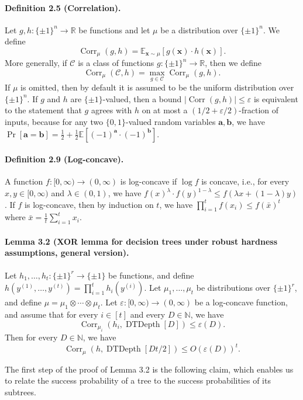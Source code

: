 \documentclass[10pt,a4paper]{article}
\newcommand{\Corr}{\operatorname{Corr}}
\newcommand{\DT}{\operatorname{DTDepth}}
\begin{document}
\paragraph{Definition 2.5 (Correlation).} Let $g,h:\{\pm1\}^n\to\mathbb R$ be functions and let $\mu$ be a distribution over $\{\pm1\}^n$. We define
\[\Corr_\mu(g,h)=\mathbb E_{\mathbf x\sim\mu}[g(\mathbf x)\cdot h(\mathbf x)].\]
More generally, if $\mathcal C$ is a class of functions $g:\{\pm1\}^n\to\mathbb R$, then we define
\[\Corr_\mu(\mathcal C,h)=\max_{g\in\mathcal C}\Corr_\mu(g,h).\]
If $\mu$ is omitted, then by default it is assumed to be the uniform distribution over $\{\pm1\}^n$.
If $g$ and $h$ are $\{\pm1\}$-valued, then a bound $|\Corr(g,h)|\le\varepsilon$ is equivalent to the statement that $g$ agrees with $h$ on at most a $(1/2+\varepsilon/2)$-fraction of inputs, because for any two $\{0,1\}$-valued random variables $\mathbf a,\mathbf b$, we have $\Pr[\mathbf a=\mathbf b]=\frac12+\frac12\mathbb E[(-1)^{\mathbf a}\cdot(-1)^{\mathbf b}]$.
\paragraph{Definition 2.9 (Log-concave).} A function $f:[0,\infty)\to(0,\infty)$ is log-concave if $\log f$ is concave, i.e., for every $x,y\in[0,\infty)$ and $\lambda\in(0,1)$, we have $f(x)^\lambda\cdot f(y)^{1-\lambda}\le f(\lambda x+(1-\lambda)y)$.
If $f$ is log-concave, then by induction on $t$, we have $\prod_{i=1}^t f(x_i)\le f(\bar x)^t$ where $\bar x=\frac1t\sum_{i=1}^t x_i$.

\paragraph{Lemma 3.2 (XOR lemma for decision trees under robust hardness assumptions, general version).}
Let $h_1,\ldots,h_t:\{\pm1\}^r\to\{\pm1\}$ be functions, and define $h(y^{(1)},\ldots,y^{(t)})=\prod_{i=1}^t h_i(y^{(i)})$. Let $\mu_1,\ldots,\mu_t$ be distributions over $\{\pm1\}^r$, and define $\mu=\mu_1\otimes\cdots\otimes\mu_t$. Let $\varepsilon:[0,\infty)\to(0,\infty)$ be a log-concave function, and assume that for every $i\in[t]$ and every $D\in\mathbb N$, we have
\[\Corr_{\mu_i}(h_i,\DT[D])\le\varepsilon(D).\]
Then for every $D\in\mathbb N$, we have
\[\Corr_\mu(h,\DT[Dt/2])\le O(\varepsilon(D))^t.\]

The first step of the proof of Lemma 3.2 is the following claim, which enables us to relate the success probability of a tree to the success probabilities of its subtrees.
\end{document}
